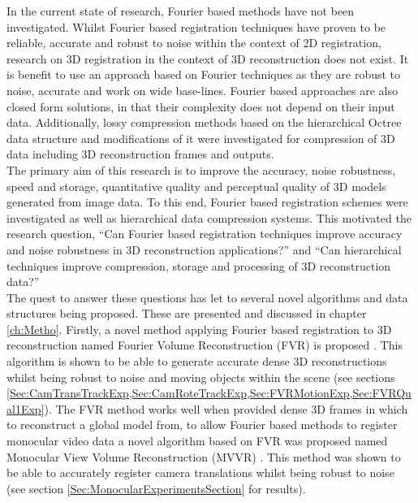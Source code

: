 In the current state of research, Fourier based methods have not been investigated. Whilst Fourier based registration techniques have proven to be reliable, accurate and robust to noise within the context of 2D registration, research on 3D registration in the context of 3D reconstruction does not exist. It is benefit to use an approach based on Fourier techniques as they are robust to noise, accurate and work on wide base-lines. Fourier based approaches are also closed form solutions, in that their complexity does not depend on their input data. Additionally, lossy compression methods based on the hierarchical Octree data structure and modifications of it \cite{Lincoln13Interpolating} were investigated for compression of 3D data including 3D reconstruction frames and outputs. \\

The primary aim of this research is to improve the accuracy, noise robustness, speed and storage, quantitative quality and perceptual quality of 3D models generated from image data. To this end, Fourier based registration schemes were investigated as well as hierarchical data compression systems. This motivated the research question, ``Can Fourier based registration techniques improve accuracy and noise robustness in 3D reconstruction applications?'' and ``Can hierarchical techniques improve compression, storage and processing of 3D reconstruction data?'' \\


The quest to answer these questions has let to several novel algorithms and data structures being proposed. These are presented and discussed in chapter \ref{ch:Metho}. Firstly, a novel method applying Fourier based registration to 3D reconstruction named Fourier Volume Reconstruction (FVR) is proposed \cite{Lincoln16Fourier,Lincoln16Dense}. This algorithm is shown to be able to generate accurate dense 3D reconstructions whilst being robust to noise and moving objects within the scene (see sections \ref{Sec:CamTransTrackExp,Sec:CamRoteTrackExp,Sec:FVRMotionExp,Sec:FVRQual1Exp}). The FVR method works well when provided dense 3D frames in which to reconstruct a global model from, to allow Fourier based methods to register monocular video data a novel algorithm based on FVR was proposed named Monocular View Volume Reconstruction (MVVR) \cite{Lincoln16Monocular}. This method was shown to be able to accurately register camera translations whilst being robust to noise (see section \ref{Sec:MonocularExperimentsSection} for results). \\

